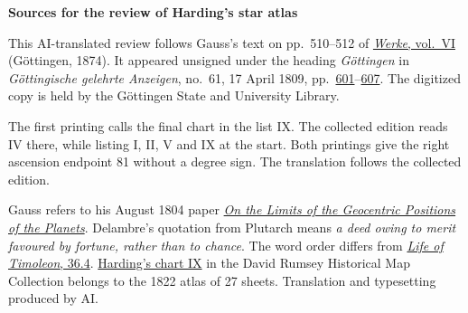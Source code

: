 \clearpage\thispagestyle{empty}
\begin{center}\textbf{Sources for the review of Harding’s star atlas}\end{center}
\noindent This AI-translated review follows Gauss’s text on pp.~510--512 of \href{https://gdz.sub.uni-goettingen.de/id/PPN236007467}{\textit{Werke}, vol.~VI} (Göttingen, 1874). It appeared unsigned under the heading \emph{Göttingen} in \textit{Göttingische gelehrte Anzeigen}, no.~61, 17 April 1809, pp.~\href{https://images.p.sub.uni-goettingen.de/iiif/image/gdz:PPN319721507_1809:00000603/full/1750,/0/default.jpg}{601}--\href{https://images.p.sub.uni-goettingen.de/iiif/image/gdz:PPN319721507_1809:00000609/full/1750,/0/default.jpg}{607}. The digitized copy is held by the Göttingen State and University Library.
\par\smallskip\noindent The first printing calls the final chart in the list IX. The collected edition reads IV there, while listing I, II, V and IX at the start. Both printings give the right ascension endpoint 81 without a degree sign. The translation follows the collected edition.
\par\smallskip\noindent Gauss refers to his August 1804 paper \hyperlink{grenzen1804.1}{\emph{On the Limits of the Geocentric Positions of the Planets}}. Delambre’s quotation from Plutarch means \emph{a deed owing to merit favoured by fortune, rather than to chance}. The word order differs from \href{https://penelope.uchicago.edu/Thayer/E/Roman/Texts/Plutarch/Lives/Timoleon*.html#36.4}{\textit{Life of Timoleon}, 36.4}. \href{https://www.davidrumsey.com/luna/servlet/detail/RUMSEY~8~1~372247~90138986:IX-Atlas-novus-coelestis-XXVII-tabu}{Harding’s chart IX} in the David Rumsey Historical Map Collection belongs to the 1822 atlas of 27 sheets. Translation and typesetting produced by AI.
\clearpage
